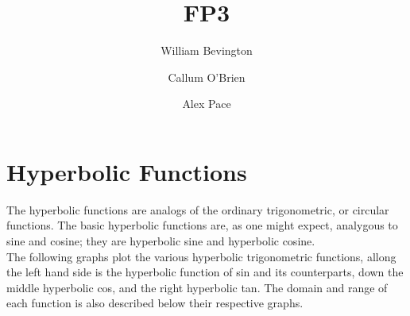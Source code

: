 \documentclass{article}
\begin{document}
\title{FP3}
\author{William Bevington \and Callum O'Brien \and Alex Pace}
\maketitle
\tableofcontents
\newpage

\section{Hyperbolic Functions}

The hyperbolic functions are analogs of the ordinary trigonometric, or circular
functions. The basic hyperbolic functions are, as one might expect, analygous to
sine and cosine; they are hyperbolic sine and hyperbolic cosine.\\
The following graphs plot the various hyperbolic trigonometric functions, allong the left hand side is the hyperbolic function of sin and its counterparts, down the middle hyperbolic cos, and the right hyperbolic tan. The domain and range of each function is also described below their respective graphs.

\begin{center}
    
     \hspace{50pt}  \hspace{50pt} 

\end{center}
\end{document}
